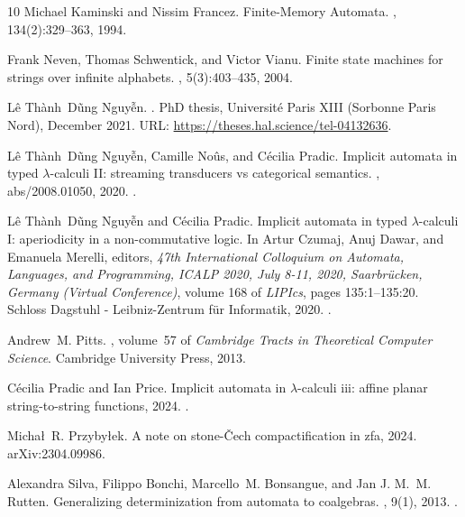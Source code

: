 \documentclass[10pt,a4paper]{amsart}
\numberwithin{equation}{section}
\theoremstyle{plain}
\begin{document}
\begin{thebibliography}{10}
Michael Kaminski and Nissim Francez.
\newblock Finite-{{Memory Automata}}.
, 134(2):329--363, 1994.

Frank Neven, Thomas Schwentick, and Victor Vianu.
\newblock Finite state machines for strings over infinite alphabets.
, 5(3):403--435, 2004.

Lê Thành~Dũng Nguy\~{\^e}n.
.
\newblock PhD thesis, Université Paris XIII (Sorbonne Paris Nord), December
  2021.
\newblock URL: \url{https://theses.hal.science/tel-04132636}.

Lê Thành~Dũng Nguy\~{\^e}n, Camille No{\^{u}}s, and Cécilia Pradic.
\newblock Implicit automata in typed {\(\lambda\)}-calculi {II:} streaming
  transducers vs categorical semantics.
, abs/2008.01050, 2020.
\newblock \href {https://arxiv.org/abs/2008.01050} {}.

Lê Thành~Dũng Nguy\~{\^e}n and Cécilia Pradic.
\newblock Implicit automata in typed $\lambda$-calculi {I}: aperiodicity in a
  non-commutative logic.
\newblock In Artur Czumaj, Anuj Dawar, and Emanuela Merelli, editors, {\em 47th
  International Colloquium on Automata, Languages, and Programming, {ICALP}
  2020, July 8-11, 2020, Saarbr{\"{u}}cken, Germany (Virtual Conference)},
  volume 168 of {\em LIPIcs}, pages 135:1--135:20. Schloss Dagstuhl -
  Leibniz-Zentrum für Informatik, 2020.
\newblock \href {https://doi.org/10.4230/LIPIcs.ICALP.2020.135}
  {}.

Andrew~M. Pitts.
, volume~57
  of {\em Cambridge Tracts in Theoretical Computer Science}.
\newblock Cambridge University Press, 2013.

Cécilia Pradic and Ian Price.
\newblock Implicit automata in $\lambda$-calculi iii: affine planar
  string-to-string functions, 2024.
\newblock \href {https://arxiv.org/abs/2404.03985} {}.

Michał~R. Przybyłek.
\newblock A note on stone-Čech compactification in zfa, 2024.
\newblock arXiv:2304.09986.

Alexandra Silva, Filippo Bonchi, Marcello~M. Bonsangue, and Jan J. M.~M.
  Rutten.
\newblock Generalizing determinization from automata to coalgebras.
, 9(1), 2013.
\newblock \href {https://doi.org/10.2168/LMCS-9(1:9)2013}
  {}.


\end{thebibliography}
\end{document}
